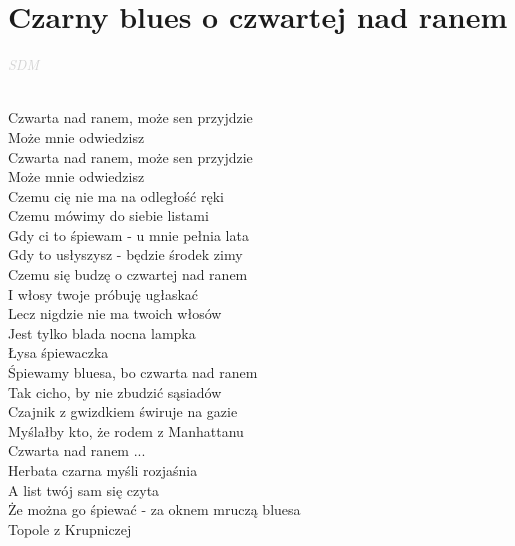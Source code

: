 \documentclass[a5paper, 10pt]{book}
\begin{document}
\newpage
\section{Czarny blues o czwartej nad ranem}\textcolor{lightgray}{\textit{SDM}}\\~\\
\begin{minipage}[t]{0.7\textwidth}

  \hspace*{4mm} Czwarta nad ranem, może sen przyjdzie\\
  \hspace*{4mm} Może mnie odwiedzisz\\
  \hspace*{4mm} Czwarta nad ranem, może sen przyjdzie\\
  \hspace*{4mm} Może mnie odwiedzisz\\

  Czemu cię nie ma na odległość ręki\\
  Czemu mówimy do siebie listami\\
  Gdy ci to śpiewam - u mnie pełnia lata\\
  Gdy to usłyszysz - będzie środek zimy\\

  Czemu się budzę o czwartej nad ranem\\
  I włosy twoje próbuję ugłaskać\\
  Lecz nigdzie nie ma twoich włosów\\
  Jest tylko blada nocna lampka\\
  Łysa śpiewaczka\\

  Śpiewamy bluesa, bo czwarta nad ranem\\
  Tak cicho, by nie zbudzić sąsiadów\\
  Czajnik z gwizdkiem świruje na gazie\\
  Myślałby kto, że rodem z Manhattanu\\

  \hspace*{4mm} Czwarta nad ranem ... \\

  Herbata czarna myśli rozjaśnia\\
  A list twój sam się czyta\\
  Że można go śpiewać - za oknem mruczą bluesa\\
  Topole z Krupniczej\\


\end{minipage}
\end{document}
